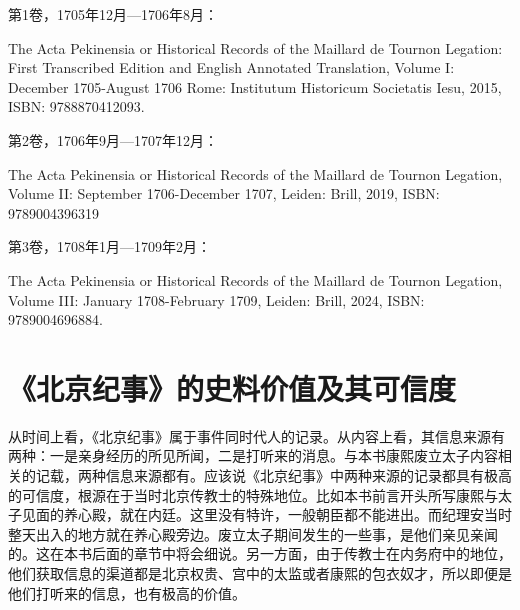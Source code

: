 
\begin{bookquote}第1卷，1705年12月—1706年8月：\end{bookquote}


\begin{bookquote}The Acta Pekinensia or Historical Records of the Maillard de Tournon Legation: First Transcribed Edition and English Annotated Translation, Volume I: December 1705-August 1706 Rome: Institutum Historicum Societatis Iesu, 2015, ISBN: 9788870412093.\end{bookquote}


\begin{bookquote}第2卷，1706年9月—1707年12月：\end{bookquote}


\begin{bookquote}The Acta Pekinensia or Historical Records of the Maillard de Tournon Legation, Volume II: September 1706-December 1707, Leiden: Brill, 2019, ISBN: 9789004396319\end{bookquote}


\begin{bookquote}第3卷，1708年1月—1709年2月：\end{bookquote}


\begin{bookquote}The Acta Pekinensia or Historical Records of the Maillard de Tournon Legation, Volume III: January 1708-February 1709, Leiden: Brill, 2024, ISBN: 9789004696884.\end{bookquote}

\begin{sectionnotes}


\end{sectionnotes}
\section{《北京纪事》的史料价值及其可信度}


从时间上看，《北京纪事》属于事件同时代人的记录。从内容上看，其信息来源有两种：一是亲身经历的所见所闻，二是打听来的消息。与本书康熙废立太子内容相关的记载，两种信息来源都有。应该说《北京纪事》中两种来源的记录都具有极高的可信度，根源在于当时北京传教士的特殊地位。比如本书前言开头所写康熙与太子见面的养心殿，就在内廷。这里没有特许，一般朝臣都不能进出。而纪理安当时整天出入的地方就在养心殿旁边。废立太子期间发生的一些事，是他们亲见亲闻的。这在本书后面的章节中将会细说。另一方面，由于传教士在内务府中的地位，他们获取信息的渠道都是北京权贵、宫中的太监或者康熙的包衣奴才，所以即便是他们打听来的信息，也有极高的价值。


